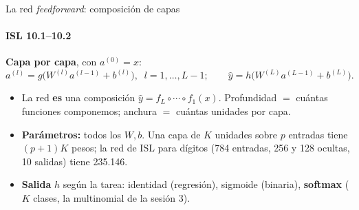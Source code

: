 \documentclass{beamer}
\newcommand{\1}{\mathbb{I}}
\begin{document}
\begin{frame}{La red \emph{feedforward}: composición de capas}
\framesubtitle{ISL 10.1--10.2}
\small
\begin{center}
\end{center}
\pause
\textbf{Capa por capa}, con $a^{(0)} = x$:
\[ a^{(l)} = g\big( W^{(l)} a^{(l-1)} + b^{(l)} \big), \;\; l = 1, \ldots, L-1; \qquad \hat{y} = h\big( W^{(L)} a^{(L-1)} + b^{(L)} \big). \]
\pause
\begin{itemize}\itemsep2pt
  \item La red \textbf{es} una composición $\hat{y} = f_L \circ \cdots \circ f_1(x)$. Profundidad $=$ cuántas funciones componemos; anchura $=$ cuántas unidades por capa.
  \item \textbf{Parámetros:} todos los $W, b$. Una capa de $K$ unidades sobre $p$ entradas tiene $(p+1)K$ pesos; la red de ISL para dígitos (784 entradas, 256 y 128 ocultas, 10 salidas) tiene 235.146.
  \item \textbf{Salida} $h$ según la tarea: identidad (regresión), sigmoide (binaria), \textbf{softmax} ($K$ clases, la multinomial de la sesión 3).
\end{itemize}
\end{frame}
\end{document}
